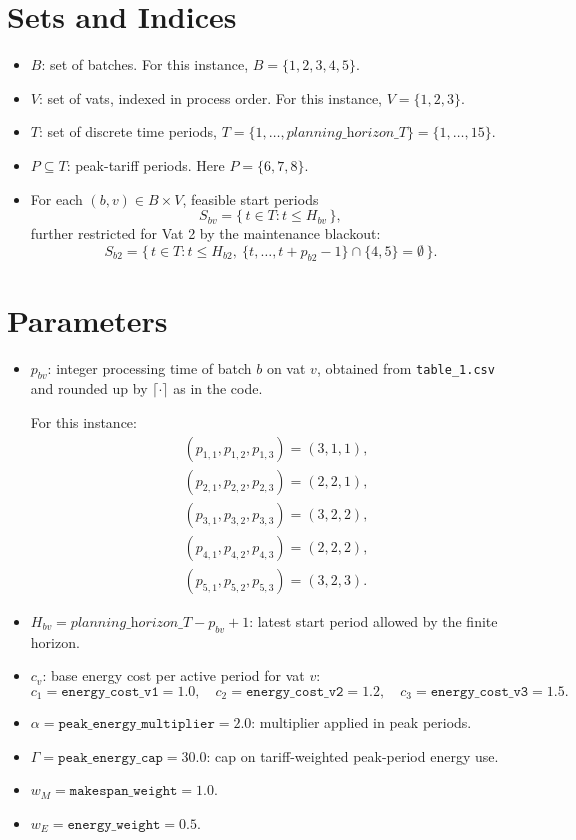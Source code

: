 \section*{Sets and Indices}

\begin{itemize}
    \item $B$: set of batches. For this instance, $B=\{1,2,3,4,5\}$.
    \item $V$: set of vats, indexed in process order. For this instance, $V=\{1,2,3\}$.
    \item $T$: set of discrete time periods, $T=\{1,\dots,\textit{planning\_horizon\_T}\}=\{1,\dots,15\}$.
    \item $P \subseteq T$: peak-tariff periods. Here $P=\{6,7,8\}$.
    \item For each $(b,v)\in B\times V$, feasible start periods
    \[
    S_{bv}=\{\,t\in T : t \le H_{bv}\,\},
    \]
    further restricted for Vat 2 by the maintenance blackout:
    \[
    S_{b2}=\{\,t\in T : t \le H_{b2},\ \{t,\dots,t+p_{b2}-1\}\cap\{4,5\}=\emptyset\,\}.
    \]
\end{itemize}

\section*{Parameters}

\begin{itemize}
    \item $p_{bv}$: integer processing time of batch $b$ on vat $v$, obtained from \texttt{table\_1.csv} and rounded up by $\lceil \cdot \rceil$ as in the code.
    
    For this instance:
    \[
    \begin{aligned}
    &(p_{1,1},p_{1,2},p_{1,3})=(3,1,1),\\
    &(p_{2,1},p_{2,2},p_{2,3})=(2,2,1),\\
    &(p_{3,1},p_{3,2},p_{3,3})=(3,2,2),\\
    &(p_{4,1},p_{4,2},p_{4,3})=(2,2,2),\\
    &(p_{5,1},p_{5,2},p_{5,3})=(3,2,3).
    \end{aligned}
    \]
    \item $H_{bv}=\textit{planning\_horizon\_T}-p_{bv}+1$: latest start period allowed by the finite horizon.
    \item $c_v$: base energy cost per active period for vat $v$:
    \[
    c_1=\texttt{energy\_cost\_v1}=1.0,\quad
    c_2=\texttt{energy\_cost\_v2}=1.2,\quad
    c_3=\texttt{energy\_cost\_v3}=1.5.
    \]
    \item $\alpha=\texttt{peak\_energy\_multiplier}=2.0$: multiplier applied in peak periods.
    \item $\Gamma=\texttt{peak\_energy\_cap}=30.0$: cap on tariff-weighted peak-period energy use.
    \item $w_M=\texttt{makespan\_weight}=1.0$.
    \item $w_E=\texttt{energy\_weight}=0.5$.
\end{itemize}

